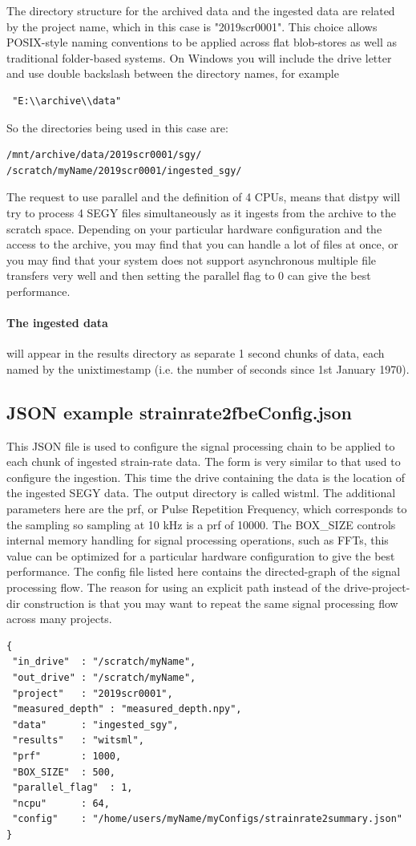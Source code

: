 The directory structure for the archived data and the ingested data are related by the project name, which in this case is "2019scr0001".
This choice allows POSIX-style naming conventions to be applied across flat blob-stores as well as traditional folder-based systems.
On Windows you will include the drive letter and use double backslash between the directory names, for example
\begin{lstlisting}
 "E:\\archive\\data"
\end{lstlisting}
So the directories being used in this case are:
\begin{lstlisting}
/mnt/archive/data/2019scr0001/sgy/
/scratch/myName/2019scr0001/ingested_sgy/
\end{lstlisting}
The request to use parallel and the definition of 4 CPUs, means that distpy will try to process 4 SEGY files simultaneously as it ingests
from the archive to the scratch space. Depending on your particular hardware configuration and the access to the archive, you may find that
you can handle a lot of files at once, or you may find that your system does not support asynchronous multiple file transfers very well and 
then setting the parallel flag to 0 can give the best performance. 
\paragraph{The ingested data } 
will appear in the results directory as separate 1 second chunks of data, each named by the unixtimestamp (i.e. the number of seconds since
1st January 1970).

\subsection{JSON example strainrate2fbeConfig.json}
This JSON file is used to configure the signal processing chain to be applied to each chunk of ingested strain-rate data.
The form is very similar to that used to configure the ingestion.
This time the drive containing the data is the location of the ingested SEGY data. The output directory is called wistml.
The additional parameters here are the prf, or Pulse Repetition Frequency, which corresponds to the sampling so sampling at 10 kHz is
a prf of 10000.
The BOX\_SIZE controls internal memory handling for signal processing operations, such as FFTs, this value can be optimized
for a particular hardware configuration to give the best performance.
The config file listed here contains the directed-graph of the signal processing flow. The reason for using an explicit path 
instead of the drive-project-dir construction is that you may want to repeat the same signal processing flow across many projects.
\begin{lstlisting}
{
 "in_drive"  : "/scratch/myName",
 "out_drive" : "/scratch/myName",
 "project"   : "2019scr0001",
 "measured_depth" : "measured_depth.npy",
 "data"      : "ingested_sgy",
 "results"   : "witsml",
 "prf"       : 1000,
 "BOX_SIZE"  : 500,
 "parallel_flag"  : 1,
 "ncpu"      : 64,
 "config"    : "/home/users/myName/myConfigs/strainrate2summary.json"
}
\end{lstlisting}
